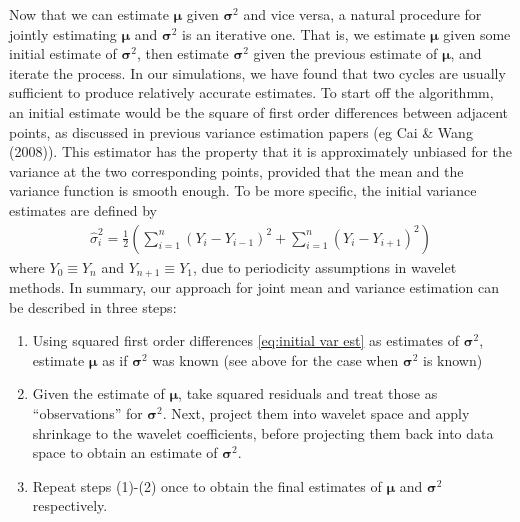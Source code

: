\documentclass[12pt]{article}
\newcommand{\s}{\sigma}
\begin{document}
Now that we can estimate $\bm{\mu}$ given $\bm{\s}^2$ and vice versa, a natural procedure for jointly estimating $\bm{\mu}$ and $\bm{\s}^2$ is an iterative one. That is, we estimate $\bm{\mu}$ given some initial estimate of $\bm{\s}^2$, then estimate $\bm{\s}^2$ given the previous estimate of $\bm{\mu}$, and iterate the process. In our simulations, we have found that two cycles are usually sufficient to produce relatively accurate estimates. To start off the algorithmm, an initial estimate would be the square of first order differences between adjacent points, as discussed in previous variance estimation papers (eg Cai \& Wang (2008)). This estimator has the property that it is approximately unbiased for the variance at the two corresponding points, provided that the mean and the variance function is smooth enough. To be more specific, the initial variance estimates are defined by
\begin{eqnarray}\label{eq:initial var est}
\hat{\s}_i^2=\frac{1}{2}\left(\sum_{i=1}^n(Y_i-Y_{i-1})^2+\sum_{i=1}^n(Y_i-Y_{i+1})^2\right)
\end{eqnarray}
where $Y_0\equiv Y_n$ and $Y_{n+1}\equiv Y_1$, due to periodicity assumptions in wavelet methods. In summary, our approach for joint mean and variance estimation can be described in three steps:
\begin{enumerate}
\item Using squared first order differences \eqref{eq:initial var est} as estimates of $\bm{\s}^2$, estimate $\bm{\mu}$ as if $\bm{\s}^2$ was known (see above for the case when $\bm{\s}^2$ is known)
\item Given the estimate of $\bm{\mu}$, take squared residuals and treat those as ``observations'' for $\bm{\s}^2$. Next, project them into wavelet space and apply shrinkage to the wavelet coefficients, before projecting them back into data space to obtain an estimate of $\bm{\s}^2$.
\item Repeat steps (1)-(2) once to obtain the final estimates of $\bm{\mu}$ and $\bm{\s}^2$ respectively.
\end{enumerate}
\end{document}
